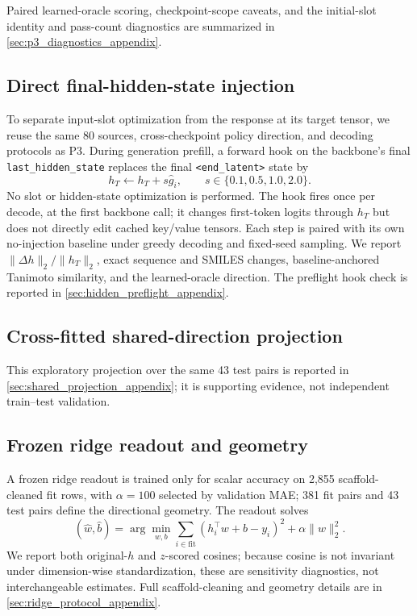 \documentclass[11pt]{article}
\begin{document}
Paired learned-oracle scoring, checkpoint-scope caveats, and the initial-slot identity and pass-count diagnostics are summarized in \cref{sec:p3_diagnostics_appendix}.

\subsection{Direct final-hidden-state injection}
\label{sec:hidden_injection_methods}

To separate input-slot optimization from the response at its target tensor, we reuse the same 80 sources, cross-checkpoint policy direction, and decoding protocols as P3. During generation prefill, a forward hook on the backbone's final \texttt{last\_hidden\_state} replaces the final \texttt{<end\_latent>} state by
\begin{equation}
 h_T\leftarrow h_T+s\hat g_i,
 \qquad s\in\{0.1,0.5,1.0,2.0\}.
\end{equation}
No slot or hidden-state optimization is performed. The hook fires once per decode, at the first backbone call; it changes first-token logits through $h_T$ but does not directly edit cached key/value tensors. Each step is paired with its own no-injection baseline under greedy decoding and fixed-seed sampling. We report $\lVert\Delta h\rVert_2/\lVert h_T\rVert_2$, exact sequence and SMILES changes, baseline-anchored Tanimoto similarity, and the learned-oracle direction. The preflight hook check is reported in \cref{sec:hidden_preflight_appendix}.

\subsection{Cross-fitted shared-direction projection}

This exploratory projection over the same 43 test pairs is reported in \cref{sec:shared_projection_appendix}; it is supporting evidence, not independent train--test validation.

\subsection{Frozen ridge readout and geometry}
\label{sec:ridge_methods}

A frozen ridge readout is trained only for scalar accuracy on 2{,}855 scaffold-cleaned fit rows, with $\alpha=100$ selected by validation MAE; 381 fit pairs and 43 test pairs define the directional geometry. The readout solves \citep{Hoerl1970Ridge}
\begin{equation}
 (\hat w,\hat b)=\arg\min_{w,b}\sum_{i\in\mathrm{fit}}(h_i^\top w+b-y_i)^2+\alpha\lVert w\rVert_2^2 .
\end{equation}
We report both original-$h$ and $z$-scored cosines; because cosine is not invariant under dimension-wise standardization, these are sensitivity diagnostics, not interchangeable estimates. Full scaffold-cleaning and geometry details are in \cref{sec:ridge_protocol_appendix}.
\end{document}
